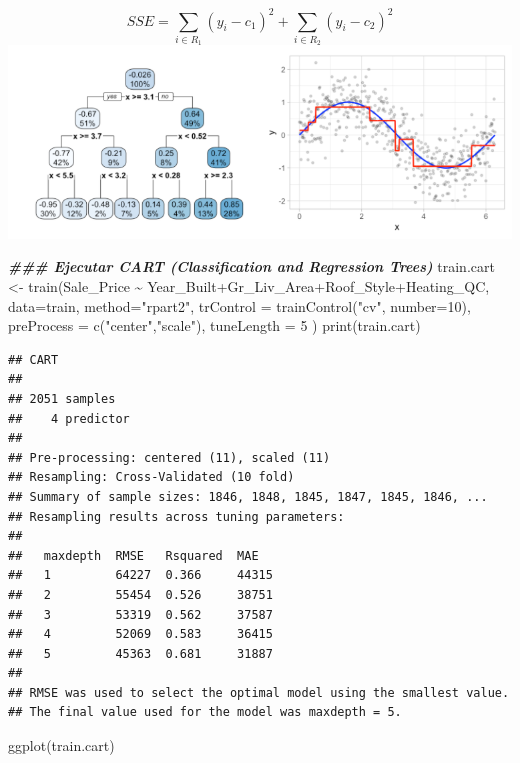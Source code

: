 \documentclass[
]{article}
\newenvironment{Shaded}{\begin{snugshade}}{\end{snugshade}}
\newcommand{\AttributeTok}[1]{\textcolor[rgb]{0.77,0.63,0.00}{#1}}
\newcommand{\DecValTok}[1]{\textcolor[rgb]{0.00,0.00,0.81}{#1}}
\newcommand{\DocumentationTok}[1]{\textcolor[rgb]{0.56,0.35,0.01}{\textbf{\textit{#1}}}}
\newcommand{\FunctionTok}[1]{\textcolor[rgb]{0.00,0.00,0.00}{#1}}
\newcommand{\NormalTok}[1]{#1}
\newcommand{\OtherTok}[1]{\textcolor[rgb]{0.56,0.35,0.01}{#1}}
\newcommand{\SpecialCharTok}[1]{\textcolor[rgb]{0.00,0.00,0.00}{#1}}
\newcommand{\StringTok}[1]{\textcolor[rgb]{0.31,0.60,0.02}{#1}}
\begin{document}
\[SSE=\sum_{i\in R_1} (y_i-c_1)^2 + \sum_{i\in R_2} (y_i-c_2)^2 \]
\includegraphics{5.png}

\begin{Shaded}
\begin{Highlighting}[]
\DocumentationTok{\#\#\# Ejecutar CART (Classification and Regression Trees)}
\NormalTok{train.cart }\OtherTok{\textless{}{-}} \FunctionTok{train}\NormalTok{(Sale\_Price }\SpecialCharTok{\textasciitilde{}}\NormalTok{ Year\_Built}\SpecialCharTok{+}\NormalTok{Gr\_Liv\_Area}\SpecialCharTok{+}\NormalTok{Roof\_Style}\SpecialCharTok{+}\NormalTok{Heating\_QC, }
                    \AttributeTok{data=}\NormalTok{train, }\AttributeTok{method=}\StringTok{"rpart2"}\NormalTok{,  }
                    \AttributeTok{trControl =} \FunctionTok{trainControl}\NormalTok{(}\StringTok{"cv"}\NormalTok{, }\AttributeTok{number=}\DecValTok{10}\NormalTok{),}
                    \AttributeTok{preProcess =} \FunctionTok{c}\NormalTok{(}\StringTok{"center"}\NormalTok{,}\StringTok{"scale"}\NormalTok{),}
                    \AttributeTok{tuneLength =} \DecValTok{5}
\NormalTok{)}
\FunctionTok{print}\NormalTok{(train.cart)}
\end{Highlighting}
\end{Shaded}

\begin{verbatim}
## CART 
## 
## 2051 samples
##    4 predictor
## 
## Pre-processing: centered (11), scaled (11) 
## Resampling: Cross-Validated (10 fold) 
## Summary of sample sizes: 1846, 1848, 1845, 1847, 1845, 1846, ... 
## Resampling results across tuning parameters:
## 
##   maxdepth  RMSE   Rsquared  MAE  
##   1         64227  0.366     44315
##   2         55454  0.526     38751
##   3         53319  0.562     37587
##   4         52069  0.583     36415
##   5         45363  0.681     31887
## 
## RMSE was used to select the optimal model using the smallest value.
## The final value used for the model was maxdepth = 5.
\end{verbatim}

\begin{Shaded}
\begin{Highlighting}[]
\FunctionTok{ggplot}\NormalTok{(train.cart)}
\end{Highlighting}
\end{Shaded}
\end{document}
